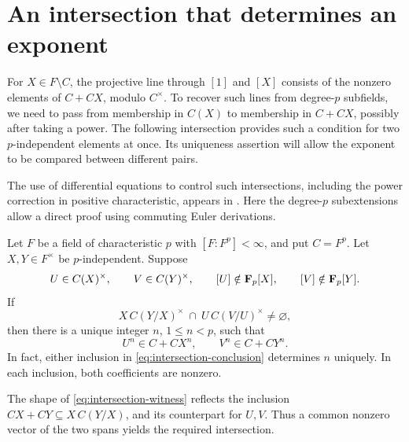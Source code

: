 \section{An intersection that determines an exponent}
\label{sec:intersection}

For $X\in F\setminus C$, the projective line through $[1]$ and $[X]$
consists of the nonzero elements of $C+CX$, modulo $C^\times$.
To recover such lines from degree-$p$
subfields, we need to pass from membership in $C(X)$ to membership in
$C+CX$, possibly after taking a power.  The following intersection provides such a
condition for two $p$-independent elements at once.  Its uniqueness assertion
will allow the exponent to be compared between different pairs.

The use of differential equations to control such intersections, including
the power correction in positive characteristic, appears in
\citet[Sections~3.4--3.5]{CadoretPirutka2021}.  Here the degree-$p$
subextensions allow a direct proof using commuting Euler derivations.

\begin{proposition}
\label{prop:intersection}
Let $F$ be a field of characteristic $p$ with $[F:F^p]<\infty$, and put
$C=F^p$.  Let $X,Y\in F^\times$ be $p$-independent.  Suppose
\[
 U\in C(X)^\times,\qquad V\in C(Y)^\times,
 \qquad [U]\notin\mathbf F_p[X],\qquad [V]\notin\mathbf F_p[Y].
\]
If
\begin{equation}
\label{eq:intersection-witness}
 X\,C(Y/X)^\times\ \cap\ U\,C(V/U)^\times\ne\varnothing,
\end{equation}
then there is a unique integer $n$, $1\le n<p$, such that
\begin{equation}
\label{eq:intersection-conclusion}
 U^n\in C+CX^n,\qquad V^n\in C+CY^n.
\end{equation}
In fact, either inclusion in \eqref{eq:intersection-conclusion} determines
$n$ uniquely.  In each inclusion, both coefficients are nonzero.
\end{proposition}

The shape of \eqref{eq:intersection-witness} reflects the inclusion
$CX+CY\subseteq X\,C(Y/X)$, and its counterpart for $U,V$.
Thus a common nonzero vector of the two spans yields the required intersection.

